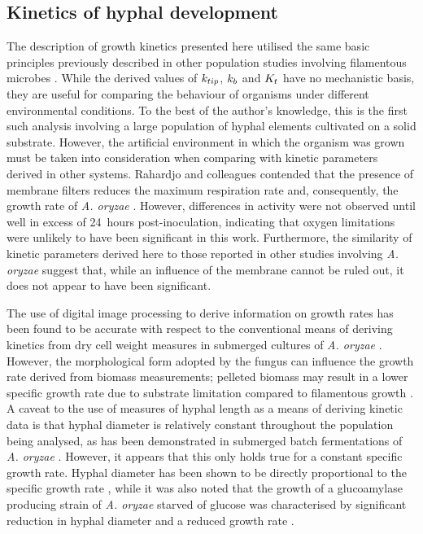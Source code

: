 \subsection{Kinetics of hyphal development}

The description of growth kinetics presented here utilised the same basic principles previously described in other population studies involving filamentous microbes \cite{carlsen1996a, spohr1997}. While the derived values of $k_{tip}$, $k_b$ and $K_t$ have no mechanistic basis, they are useful for comparing the behaviour of organisms under different environmental conditions. To the best of the author's knowledge, this is the first such analysis involving a large population of hyphal elements cultivated on a solid substrate. However, the artificial environment in which the organism was grown must be taken into consideration when comparing with kinetic parameters derived in other systems. Rahardjo and colleagues contended that the presence of membrane filters reduces the maximum respiration rate and, consequently, the growth rate of \emph{A. oryzae} \cite{rahardjo2004}. However, differences in activity were not observed until well in excess of 24~hours post-inoculation, indicating that oxygen limitations were unlikely to have been significant in this work. Furthermore, the similarity of kinetic parameters derived here to those reported in other studies involving \emph{A. oryzae} suggest that, while an influence of the membrane cannot be ruled out, it does not appear to have been significant.

The use of digital image processing to derive information on growth rates has been found to be accurate with respect to the conventional means of deriving kinetics from dry cell weight measures in submerged cultures of \emph{A. oryzae} \cite{carlsen1996a, spohr1997}. However, the morphological form adopted by the fungus can influence the growth rate derived from biomass measurements; pelleted biomass may result in a lower specific growth rate due to substrate limitation compared to filamentous growth \cite{carlsen1996a}. A caveat to the use of measures of hyphal length as a means of deriving kinetic data is that hyphal diameter is relatively constant throughout the population being analysed, as has been demonstrated in submerged batch fermentations of \emph{A. oryzae} \cite{carlsen1996a, spohr1997, li2000}. However, it appears that this only holds true for a constant specific growth rate. Hyphal diameter has been shown to be directly proportional to the specific growth rate \cite{agger1998}, while it was also noted that the growth of a glucoamylase producing strain of \emph{A. oryzae} starved of glucose was characterised by significant reduction in hyphal diameter and a reduced growth rate \cite{pollack2008}.

